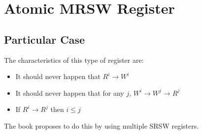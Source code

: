 \section{\textbf{Atomic MRSW Register}}
\subsection{Particular Case}
\par
The characteristics of this type of register are:
\begin{itemize}
\item It should never happen that $R^{i} \rightarrow W^{i}$
\item It should never happen that for any ${j}$, ${W^{i} \rightarrow W^{j} \rightarrow R^{j}}$
\item If ${R^{i} \rightarrow R^{j}}$ then ${i \leq j}$
\end{itemize}
The book proposes to do this by using multiple SRSW registers.
